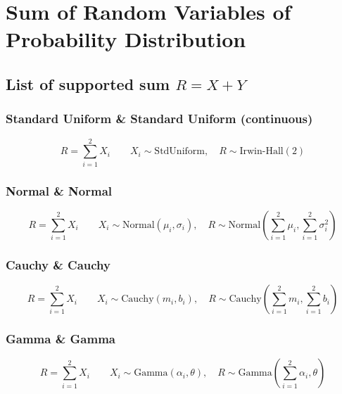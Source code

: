 \chapter{Sum of Random Variables of Probability Distribution}
\label{ch:sum_rv}


\section{List of supported sum $R = X + Y$}

\subsection{Standard Uniform \& Standard Uniform (continuous)}
    \begin{equation}
        R = \sum_{i=1}^2 X_i \qquad 
        X_i \sim \text{StdUniform}, \quad 
        R \sim \text{Irwin-Hall}(2)
    \end{equation}

\subsection{Normal \& Normal}

    \begin{equation}
        R = \sum_{i=1}^2 X_i \qquad 
        X_i \sim \text{Normal}(\mu_i,\sigma_i), \quad 
        R \sim \text{Normal}\left(\sum _{i=1}^{2}\mu _{i},\sum _{i=1}^{2}\sigma _{i}^{2}\right)
    \end{equation}

\subsection{Cauchy \& Cauchy}

    \begin{equation}
        R = \sum_{i=1}^2 X_i \qquad 
        X_i \sim \text{Cauchy}(m_i,b_i), \quad 
        R \sim \text{Cauchy}\left(\sum _{i=1}^{2}m_{i},\sum _{i=1}^{2}b _{i}\right)
    \end{equation}

\subsection{Gamma \& Gamma}

    \begin{equation}
        R = \sum_{i=1}^2 X_i \qquad 
        X_i \sim \text{Gamma}(\alpha_i,\theta), \quad 
        R \sim \text{Gamma}\left(\sum _{i=1}^{2}\alpha_{i},\theta \right)
    \end{equation}

